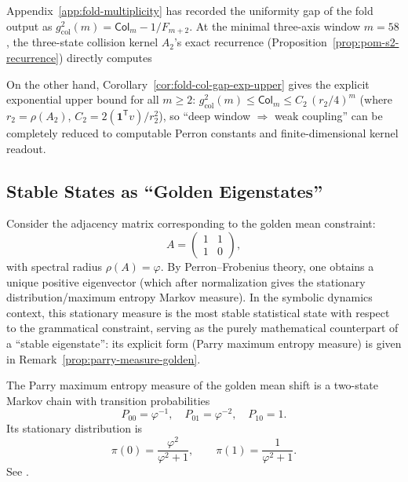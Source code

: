 \begin{remark}\label{rem:gut-m58-collision-gap-scale}
Appendix~\ref{app:fold-multiplicity} has recorded the uniformity gap of the fold output as \(g_{\mathrm{col}}^2(m)=\mathsf{Col}_m-1/F_{m+2}\).
At the minimal three-axis window \(m=58\), the three-state collision kernel \(A_2\)'s exact recurrence (Proposition~\ref{prop:pom-s2-recurrence}) directly computes

\par
On the other hand, Corollary~\ref{cor:fold-col-gap-exp-upper} gives the explicit exponential upper bound for all \(m\ge 2\):
\(
g_{\mathrm{col}}^2(m)\le \mathsf{Col}_m\le C_2\,(r_2/4)^m
\)
(where \(r_2=\rho(A_2)\), \(C_2=2(\mathbf{1}^{\mathsf T}v)/r_2^2\)),
so ``deep window \(\Rightarrow\) weak coupling'' can be completely reduced to computable Perron constants and finite-dimensional kernel readout.
\end{remark}

\subsection{Stable States as ``Golden Eigenstates''}

Consider the adjacency matrix corresponding to the golden mean constraint:
\[
A=\begin{pmatrix}
1 & 1\\
1 & 0
\end{pmatrix},
\]
with spectral radius $\rho(A)=\varphi$. By Perron--Frobenius theory, one obtains a unique positive eigenvector (which after normalization gives the stationary distribution/maximum entropy Markov measure). In the symbolic dynamics context, this stationary measure is the most stable statistical state with respect to the grammatical constraint, serving as the purely mathematical counterpart of a ``stable eigenstate'':
its explicit form (Parry maximum entropy measure) is given in Remark~\ref{prop:parry-measure-golden}.

\begin{remark}\label{prop:parry-measure-golden}
The Parry maximum entropy measure of the golden mean shift is a two-state Markov chain with transition probabilities
\[
P_{00}=\varphi^{-1},\quad P_{01}=\varphi^{-2},\quad P_{10}=1.
\]
Its stationary distribution is
\[
\pi(0)=\frac{\varphi^2}{\varphi^2+1},\qquad
\pi(1)=\frac{1}{\varphi^2+1}.
\]
See \cite{LindMarcus1995}.
\end{remark}

